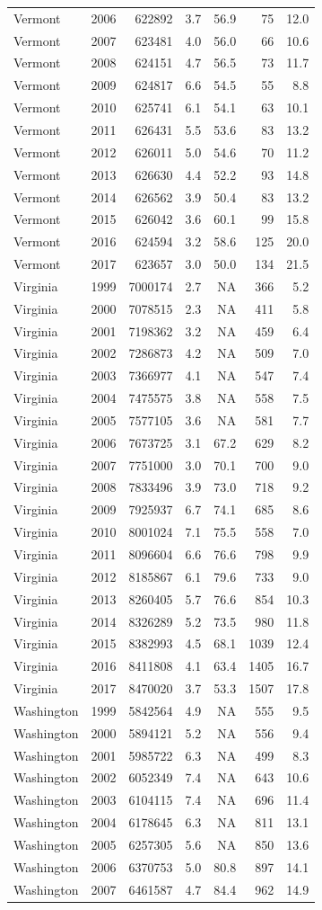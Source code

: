 \documentclass[
]{article}
\begin{document}
\begin{longtable}[]{@{}lrrrrrr@{}}
Vermont & 2006 & 622892 & 3.7 & 56.9 & 75 & 12.0\tabularnewline
Vermont & 2007 & 623481 & 4.0 & 56.0 & 66 & 10.6\tabularnewline
Vermont & 2008 & 624151 & 4.7 & 56.5 & 73 & 11.7\tabularnewline
Vermont & 2009 & 624817 & 6.6 & 54.5 & 55 & 8.8\tabularnewline
Vermont & 2010 & 625741 & 6.1 & 54.1 & 63 & 10.1\tabularnewline
Vermont & 2011 & 626431 & 5.5 & 53.6 & 83 & 13.2\tabularnewline
Vermont & 2012 & 626011 & 5.0 & 54.6 & 70 & 11.2\tabularnewline
Vermont & 2013 & 626630 & 4.4 & 52.2 & 93 & 14.8\tabularnewline
Vermont & 2014 & 626562 & 3.9 & 50.4 & 83 & 13.2\tabularnewline
Vermont & 2015 & 626042 & 3.6 & 60.1 & 99 & 15.8\tabularnewline
Vermont & 2016 & 624594 & 3.2 & 58.6 & 125 & 20.0\tabularnewline
Vermont & 2017 & 623657 & 3.0 & 50.0 & 134 & 21.5\tabularnewline
Virginia & 1999 & 7000174 & 2.7 & NA & 366 & 5.2\tabularnewline
Virginia & 2000 & 7078515 & 2.3 & NA & 411 & 5.8\tabularnewline
Virginia & 2001 & 7198362 & 3.2 & NA & 459 & 6.4\tabularnewline
Virginia & 2002 & 7286873 & 4.2 & NA & 509 & 7.0\tabularnewline
Virginia & 2003 & 7366977 & 4.1 & NA & 547 & 7.4\tabularnewline
Virginia & 2004 & 7475575 & 3.8 & NA & 558 & 7.5\tabularnewline
Virginia & 2005 & 7577105 & 3.6 & NA & 581 & 7.7\tabularnewline
Virginia & 2006 & 7673725 & 3.1 & 67.2 & 629 & 8.2\tabularnewline
Virginia & 2007 & 7751000 & 3.0 & 70.1 & 700 & 9.0\tabularnewline
Virginia & 2008 & 7833496 & 3.9 & 73.0 & 718 & 9.2\tabularnewline
Virginia & 2009 & 7925937 & 6.7 & 74.1 & 685 & 8.6\tabularnewline
Virginia & 2010 & 8001024 & 7.1 & 75.5 & 558 & 7.0\tabularnewline
Virginia & 2011 & 8096604 & 6.6 & 76.6 & 798 & 9.9\tabularnewline
Virginia & 2012 & 8185867 & 6.1 & 79.6 & 733 & 9.0\tabularnewline
Virginia & 2013 & 8260405 & 5.7 & 76.6 & 854 & 10.3\tabularnewline
Virginia & 2014 & 8326289 & 5.2 & 73.5 & 980 & 11.8\tabularnewline
Virginia & 2015 & 8382993 & 4.5 & 68.1 & 1039 & 12.4\tabularnewline
Virginia & 2016 & 8411808 & 4.1 & 63.4 & 1405 & 16.7\tabularnewline
Virginia & 2017 & 8470020 & 3.7 & 53.3 & 1507 & 17.8\tabularnewline
Washington & 1999 & 5842564 & 4.9 & NA & 555 & 9.5\tabularnewline
Washington & 2000 & 5894121 & 5.2 & NA & 556 & 9.4\tabularnewline
Washington & 2001 & 5985722 & 6.3 & NA & 499 & 8.3\tabularnewline
Washington & 2002 & 6052349 & 7.4 & NA & 643 & 10.6\tabularnewline
Washington & 2003 & 6104115 & 7.4 & NA & 696 & 11.4\tabularnewline
Washington & 2004 & 6178645 & 6.3 & NA & 811 & 13.1\tabularnewline
Washington & 2005 & 6257305 & 5.6 & NA & 850 & 13.6\tabularnewline
Washington & 2006 & 6370753 & 5.0 & 80.8 & 897 & 14.1\tabularnewline
Washington & 2007 & 6461587 & 4.7 & 84.4 & 962 & 14.9\tabularnewline

\end{longtable}
\end{document}
